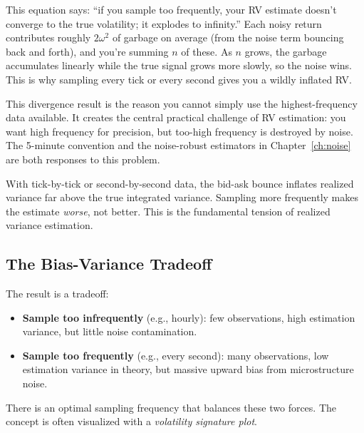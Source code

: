 \begin{intuition}
This equation says: ``if you sample too frequently, your RV estimate doesn't converge to the true volatility; it explodes to infinity.''
Each noisy return contributes roughly $2\omega^2$ of garbage on average (from the noise term bouncing back and forth), and you're summing $n$ of these.
As $n$ grows, the garbage accumulates linearly while the true signal grows more slowly, so the noise wins.
This is why sampling every tick or every second gives you a wildly inflated RV.
\end{intuition}

\begin{projectconnection}
This divergence result is the reason you cannot simply use the highest-frequency data available.
It creates the central practical challenge of RV estimation: you want high frequency for precision, but too-high frequency is destroyed by noise.
The 5-minute convention and the noise-robust estimators in Chapter~\ref{ch:noise} are both responses to this problem.
\end{projectconnection}

\begin{warning}
With tick-by-tick or second-by-second data, the bid-ask bounce inflates realized variance far above the true integrated variance.
Sampling more frequently makes the estimate \emph{worse}, not better.
This is the fundamental tension of realized variance estimation.
\end{warning}

\subsection{The Bias-Variance Tradeoff}

The result is a tradeoff:
\begin{itemize}[nosep]
  \item \textbf{Sample too infrequently} (e.g., hourly): few observations, high estimation variance, but little noise contamination.
  \item \textbf{Sample too frequently} (e.g., every second): many observations, low estimation variance in theory, but massive upward bias from microstructure noise.
\end{itemize}

There is an optimal sampling frequency that balances these two forces.
The concept is often visualized with a \emph{volatility signature plot}.

